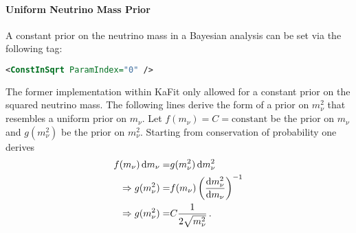 \paragraph{Uniform Neutrino Mass Prior}
A constant prior on the neutrino mass in a Bayesian analysis can be set via the following tag:
\begin{lstlisting}[language=XML]
<ConstInSqrt ParamIndex="0" />
\end{lstlisting}
The former implementation within KaFit only allowed for a constant prior on the squared neutrino mass. The following lines derive the form of a prior on $m_\nu^2$ that resembles a uniform prior on $m_\nu$. Let $f(m_\nu)=C=\mathrm{constant}$ be the prior on $m_\nu$ and $g(m_\nu^2)$ be the prior on $m_\nu^2$. Starting from conservation of probability one derives
\begin{align*}
f(m_\nu)\mathop{}\!\mathrm{d} m_\nu =& g(m_\nu^2) \mathop{}\!\mathrm{d} m_\nu^2 \\
\Rightarrow
g(m_\nu^2) =& f(m_\nu) \left( \frac{\mathop{}\!\mathrm{d} m_\nu^2}{\mathop{}\!\mathrm{d} m_\nu} \right)^{-1} \\
\Rightarrow
g(m_\nu^2) =& C \frac{1}{2\sqrt{m_\nu^2}}
\text{\,.}
\end{align*}